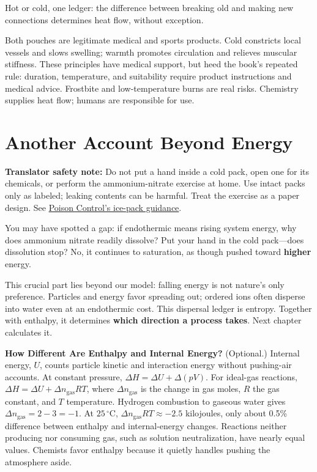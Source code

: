Hot or cold, one ledger: the difference between breaking old and making new connections determines heat flow, without exception.

Both pouches are legitimate medical and sports products. Cold constricts local vessels and slows swelling; warmth promotes circulation and relieves muscular stiffness. These principles have medical support, but heed the book's repeated rule: duration, temperature, and suitability require product instructions and medical advice. Frostbite and low-temperature burns are real risks. Chemistry supplies heat flow; humans are responsible for use.

\section{Another Account Beyond Energy}

\textbf{Translator safety note:} Do not put a hand inside a cold pack, open one for its chemicals, or perform the ammonium-nitrate exercise at home. Use intact packs only as labeled; leaking contents can be harmful. Treat the exercise as a paper design. See \href{https://www.poison.org/articles/whats-inside-ice-packs-201}{Poison Control's ice-pack guidance}.

You may have spotted a gap: if endothermic means rising system energy, why does ammonium nitrate readily dissolve? Put your hand in the cold pack---does dissolution stop? No, it continues to saturation, as though pushed toward \textbf{higher} energy.

This crucial part lies beyond our model: falling energy is not nature's only preference. Particles and energy favor spreading out; ordered ions often disperse into water even at an endothermic cost. This dispersal ledger is entropy. Together with enthalpy, it determines \textbf{which direction a process takes}. Next chapter calculates it.

\begin{tiaozhan}
\textbf{How Different Are Enthalpy and Internal Energy?} (Optional.) Internal energy, $U$, counts particle kinetic and interaction energy without pushing-air accounts. At constant pressure, $\Delta H=\Delta U+\Delta(pV)$. For ideal-gas reactions, $\Delta H=\Delta U+\Delta n_{\text{gas}}RT$, where $\Delta n_{\text{gas}}$ is the change in gas moles, $R$ the gas constant, and $T$ temperature. Hydrogen combustion to gaseous water gives $\Delta n_{\text{gas}}=2-3=-1$. At $25\,^{\circ}\mathrm{C}$, $\Delta n_{\text{gas}}RT\approx-2.5$ kilojoules, only about 0.5\% difference between enthalpy and internal-energy changes. Reactions neither producing nor consuming gas, such as solution neutralization, have nearly equal values. Chemists favor enthalpy because it quietly handles pushing the atmosphere aside.
\end{tiaozhan}

